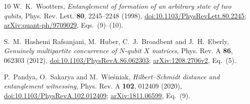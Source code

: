\documentclass[11pt]{article}
\begin{document}
\begin{thebibliography}{10}
W.~K.~Wootters, \emph{Entanglement of formation of an arbitrary state of two qubits},
Phys. Rev. Lett. \textbf{80}, 2245--2248 (1998),
\href{https://doi.org/10.1103/PhysRevLett.80.2245}{doi:10.1103/PhysRevLett.80.2245};
\href{https://arxiv.org/abs/quant-ph/9709029}{arXiv:quant-ph/9709029}, Eqs.~(9)--(10).

S.~M.~Hashemi Rafsanjani, M.~Huber, C.~J.~Broadbent and J.~H.~Eberly,
\emph{Genuinely multipartite concurrence of $N$-qubit $X$ matrices},
Phys. Rev. A \textbf{86}, 062303 (2012),
\href{https://doi.org/10.1103/PhysRevA.86.062303}{doi:10.1103/PhysRevA.86.062303};
\href{https://arxiv.org/abs/1208.2706v2}{arXiv:1208.2706v2}, Eq.~(5).

P.~Pandya, O.~Sakarya and M.~Wie\'sniak,
\emph{Hilbert--Schmidt distance and entanglement witnessing},
Phys. Rev. A \textbf{102}, 012409 (2020),
\href{https://doi.org/10.1103/PhysRevA.102.012409}{doi:10.1103/PhysRevA.102.012409};
\href{https://arxiv.org/abs/1811.06599}{arXiv:1811.06599}, Eq.~(9).
\end{thebibliography}
\end{document}
